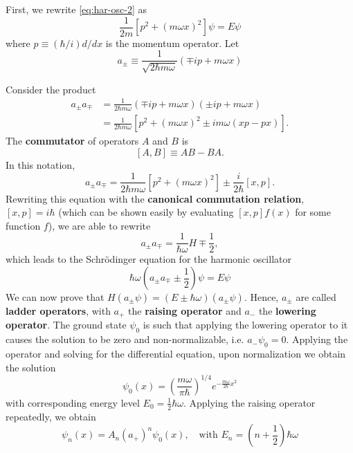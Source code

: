 \documentclass{article}
\begin{document}
First, we rewrite \eqref{eq:har-osc-2} as
\begin{equation} \label{eq:har-osc-alg-1}
  \frac{1}{2m}[p^2 + (m \omega x)^2]\psi = E\psi
\end{equation}
where $p \equiv (\hbar/i)d/dx$ is the momentum operator. Let
\begin{equation} \label{eq:har-osc-alg-a}
  \boxed{
    a_{\pm} \equiv \frac{1}{\sqrt{2 \hbar m \omega}}(\mp ip + m \omega x)
  }
\end{equation}

Consider the product
\begin{align*}
  a_{\pm}a_{\mp}
  &= \frac{1}{2 \hbar m \omega}(\mp ip + m \omega x)(\pm ip + m \omega x) \\
  &= \frac{1}{2 \hbar m \omega}[p^2 + (m \omega x)^2 \pm im\omega(xp - px)].
\end{align*}
The \textbf{commutator} of operators $A$ and $B$ is \[
  [A, B] \equiv AB - BA.
\] In this notation, \[
  a_{\pm}a_{\mp}
  = \frac{1}{2 \hbar m \omega}[p^2 + (m \omega x)^2]
  \pm \frac{i}{2\hbar}[x, p].
\] Rewriting this equation with the \textbf{canonical commutation relation},
$[x, p] = i\hbar$ (which can be shown easily by evaluating $[x, p]f(x)$ for
some function $f$), we are able to rewrite \[
  a_{\pm}a_{\mp} = \frac{1}{\hbar\omega}H \mp \frac{1}{2},
\] which leads to the Schr\"{o}dinger equation for the harmonic oscillator
\begin{equation} \label{eq:har-osc-alg}
  \hbar\omega\left(a_{\pm}a_{\mp} \pm \frac{1}{2}\right)\psi = E\psi
\end{equation}
We can now prove that $H(a_{\pm}\psi) = (E \pm \hbar\omega)(a_{\pm}\psi)$.
Hence, $a_{\pm}$ are called \textbf{ladder operators}, with $a_+$ the
\textbf{raising operator} and $a_-$ the \textbf{lowering operator}. The ground
state $\psi_0$ is such that applying the lowering operator to it causes the
solution to be zero and non-normalizable, i.e. $a_-\psi_0 = 0$. Applying the
operator and solving for the differential equation, upon normalization we
obtain the solution
\begin{equation} \label{eq:har-osc-alg-grd-st}
  \boxed{
    \psi_0(x) = \left(\frac{m\omega}{\pi\hbar}\right)^{1/4}
    e^{-\frac{m\omega}{2\hbar}x^2}
  }
\end{equation}
with corresponding energy level $E_0 = \frac{1}{2}\hbar\omega$. Applying the
raising operator repeatedly, we obtain
\begin{equation} \label{eq:har-osc-alg-sta-st-1}
  \psi_n(x) = A_n(a_+)^n\psi_0(x), \quad
  \text{with } E_n = \left(n + \frac{1}{2}\right)\hbar\omega
\end{equation}
\end{document}
